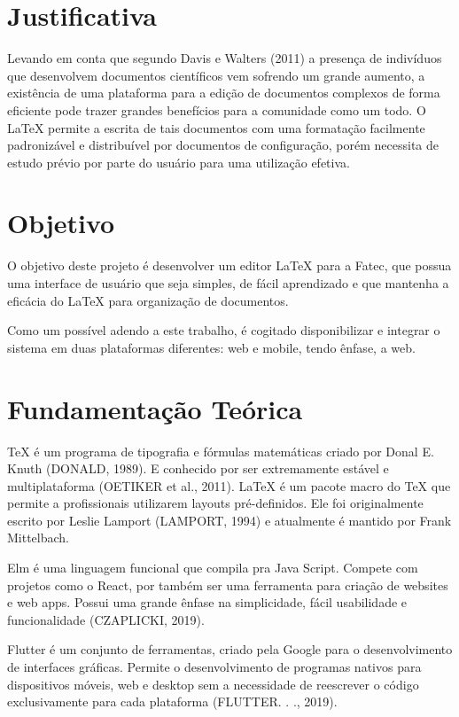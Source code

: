 \documentclass[article,12pt,oneside,a4paper,english,brazil,sumario=tradicional]{abntex2}
\begin{document}
\begin{footnotesize}
\section{Justificativa}

  Levando em conta que segundo Davis e Walters (2011) a presença de indivíduos que desenvolvem documentos científicos 
	vem sofrendo um grande aumento, a existência de uma plataforma para a edição de documentos complexos de forma 
	eficiente pode trazer grandes benefícios para a comunidade como um todo. O LaTeX permite a escrita de tais documentos 
	com uma formatação facilmente padronizável e distribuível por documentos de configuração, porém necessita de estudo 
	prévio por parte do usuário para uma utilização efetiva.





\section{Objetivo}

O objetivo deste projeto é desenvolver um editor LaTeX para a Fatec, que possua uma interface de usuário que seja simples, 
	de fácil aprendizado e que mantenha a eficácia do LaTeX para organização de documentos.

Como um possível adendo a este trabalho, é cogitado disponibilizar e integrar o sistema em duas plataformas diferentes: 
	web e mobile, tendo ênfase, a web.





\section{Fundamentação Teórica}

TeX é um programa de tipografia e fórmulas matemáticas criado por Donal E. Knuth (DONALD, 1989). 
	E conhecido por ser extremamente estável e multiplataforma (OETIKER et al., 2011).
LaTeX é um pacote macro do TeX que permite a profissionais utilizarem layouts pré-definidos. 
	Ele foi originalmente escrito por Leslie Lamport (LAMPORT, 1994) e atualmente é mantido por Frank Mittelbach.

Elm é uma linguagem funcional que compila pra Java Script. Compete com projetos como o React, 
	por também ser uma ferramenta para criação de websites e web apps. Possui uma grande ênfase na simplicidade, 
	fácil usabilidade e funcionalidade (CZAPLICKI, 2019).

Flutter é um conjunto de ferramentas, criado pela Google para o desenvolvimento de interfaces gráficas. 
	Permite o desenvolvimento de programas nativos para dispositivos móveis, web e desktop sem a necessidade 
	de reescrever o código exclusivamente para cada plataforma (FLUTTER. . ., 2019).






\end{footnotesize}
\end{document}

